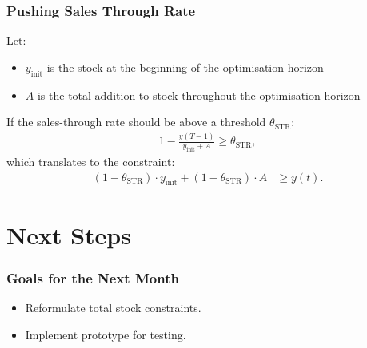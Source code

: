 \documentclass[xcolor=table]{beamer}
\begin{document}
\begin{frame}[t]
\frametitle{Pushing Sales Through Rate}
  Let:
\begin{itemize}
  \item $y_{\text{init}}$ is the stock at the beginning of the optimisation
    horizon
\item $A$ is the total addition to stock throughout the optimisation horizon 
 \end{itemize}

If the sales-through rate should be above a threshold $\theta_{\text{STR}}$:
\begin{align*}
  1 - \frac{y(T - 1)}{y_{\text{init}} + A} \geq \theta_{\text{STR}},
\end{align*}
which translates to the constraint:
  \begin{align*}
    (1 - \theta_{\text{STR}}) \cdot y_{\text{init}} +  (1 -
    \theta_{\text{STR}}) \cdot A & \geq y(t).
  \end{align*}
\end{frame}

\section{Next Steps}

\begin{frame}[t]
  \frametitle{Goals for the Next Month}
  \begin{itemize}
    \item Reformulate total stock constraints.
    \item Implement prototype for testing.
   \end{itemize}
\end{frame}
\end{document}
